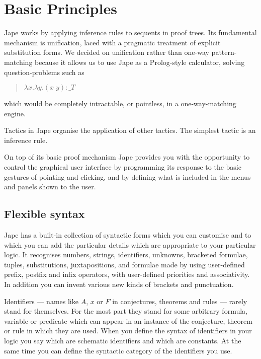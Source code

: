 \chapter{Basic Principles}
\label{chap:basics}

Jape works by applying inference rules to sequents in proof trees. Its fundamental mechanism is unification, laced with a pragmatic treatment of explicit substitution forms. We decided on unification rather than one-way pattern-matching because it allows us to use Jape as a Prolog-style calculator, solving question-problems such as
\begin{quote}
$\lambda x.\lambda y.(x\;y): \_T$
\end{quote}
which would be completely intractable, or pointless, in a one-way-matching engine.

Tactics in Jape organise the application of other tactics. The simplest tactic is an inference rule.

On top of its basic proof mechanism Jape provides you with the opportunity to control the graphical user interface by programming its response to the basic gestures of pointing and clicking, and by defining what is included in the menus and panels shown to the user.

\section{Flexible syntax}

Jape has a built-in collection of syntactic forms which you can customise and to which you can add the particular details which are appropriate to your particular logic. It recognises numbers, strings, identifiers, unknowns, bracketed formulae, tuples, substitutions, juxtapositions, and formulae made by using user-defined prefix, postfix and infix operators, with user-defined priorities and associativity. In addition you can invent various new kinds of brackets and punctuation.

Identifiers --- names like $A$, $x$ or $F$ in conjectures, theorems and rules --- rarely stand for themselves. For the most part they stand for some arbitrary formula, variable or predicate which can appear in an instance of the conjecture, theorem or rule in which they are used. When you define the syntax of identifiers in your logic you say which are schematic identifiers and which are constants. At the same time you can define the syntactic category of the identifiers you use.

